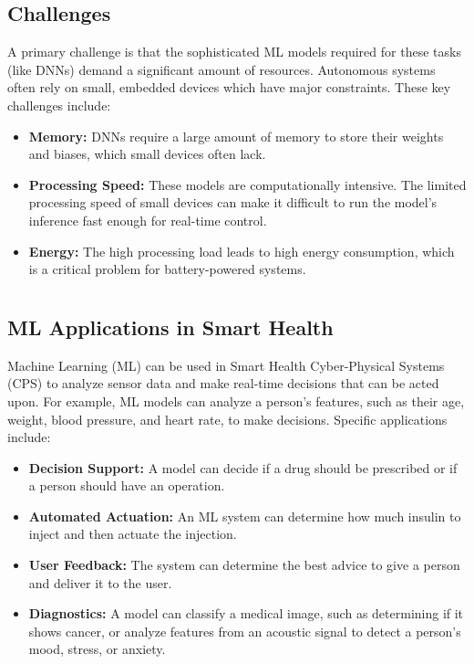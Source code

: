 \documentclass[a4paper,12pt]{article}
\begin{document}
\subsection{Challenges}
A primary challenge is that the sophisticated ML models required for these tasks (like DNNs) demand a significant amount of resources. Autonomous systems often rely on small, embedded devices which have major constraints. These key challenges include:
\begin{itemize}
    \item \textbf{Memory:} DNNs require a large amount of memory to store their weights and biases, which small devices often lack.
    \item \textbf{Processing Speed:} These models are computationally intensive. The limited processing speed of small devices can make it difficult to run the model's inference fast enough for real-time control.
    \item \textbf{Energy:} The high processing load leads to high energy consumption, which is a critical problem for battery-powered systems.
\end{itemize}

\section{}

\subsection{ML Applications in Smart Health}
Machine Learning (ML) can be used in Smart Health Cyber-Physical Systems (CPS) to analyze sensor data and make real-time decisions that can be acted upon. For example, ML models can analyze a person's features, such as their age, weight, blood pressure, and heart rate, to make decisions. Specific applications include:

\begin{itemize}
    \item \textbf{Decision Support:} A model can decide if a drug should be prescribed or if a person should have an operation.
    \item \textbf{Automated Actuation:} An ML system can determine how much insulin to inject and then actuate the injection.
    \item \textbf{User Feedback:} The system can determine the best advice to give a person and deliver it to the user.
    \item \textbf{Diagnostics:} A model can classify a medical image, such as determining if it shows cancer, or analyze features from an acoustic signal to detect a person's mood, stress, or anxiety.
\end{itemize}
\end{document}
